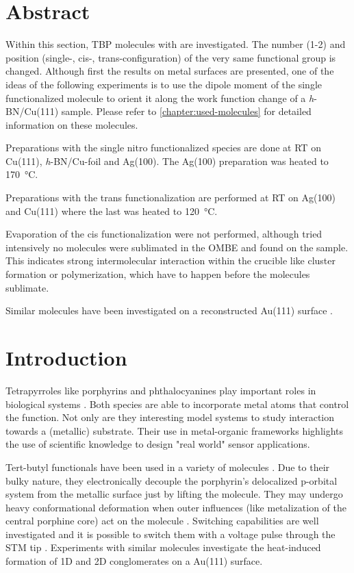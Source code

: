 \section{Abstract}
Within this section, TBP molecules with are investigated. The number (1-2) and position (single-, cis-, trans-configuration) of the very same functional group is changed. Although first the results on metal surfaces are presented, one of the ideas of the following experiments is to use the dipole moment of the single functionalized molecule to orient it along the work function change of a \textit{h}-BN/Cu(111) sample. Please refer to \autoref{chapter:used-molecules} for detailed information on these molecules. 

Preparations with the single nitro functionalized species are done at RT on Cu(111), \textit{h}-BN/Cu-foil and Ag(100). The Ag(100) preparation was heated to \SI{170}{\celsius}. 

Preparations with the trans functionalization are performed at RT on Ag(100) and Cu(111) where the last was heated to \SI{120}{\celsius}.

Evaporation of the cis functionalization were not performed, although tried intensively no molecules were sublimated in the OMBE and found on the sample. This indicates strong intermolecular interaction within the crucible like cluster formation or polymerization, which have to happen before the molecules sublimate.

Similar molecules have been investigated on a reconstructed Au(111) surface \cite{yokoyama_selective_2001}.

\section{Introduction}
Tetrapyrroles like porphyrins and phthalocyanines play important roles in biological systems \cite{battersby_tetrapyrroles_2000}. Both species are able to incorporate metal atoms that control the function. Not only are they interesting model systems to study interaction towards a (metallic) substrate\cite{auwarter_porphyrins_2015, auwarter_controlled_2007, diller_vacuo_2016}. Their use in metal-organic frameworks highlights the use of scientific knowledge to design "real world" sensor applications\cite{Lustig_Metal-organic_2017}. 

Tert-butyl functionals have been used in a variety of molecules \cite{moresco_conformational_2001}. Due to their bulky nature, they electronically decouple the porphyrin’s delocalized p-orbital system from the metallic surface just by lifting the molecule. They may undergo heavy conformational deformation when outer influences (like metalization of the central porphine core) act on the molecule \cite{stark_massive_2014}. Switching capabilities are well investigated \cite{loppacher_direct_2003} and it is possible to switch them with a voltage pulse through the STM tip \cite{ditze_energetics_2014}. Experiments with similar molecules investigate the heat-induced formation of 1D and 2D conglomerates on a Au(111) surface.\cite{pham_heat-induced_2015}

